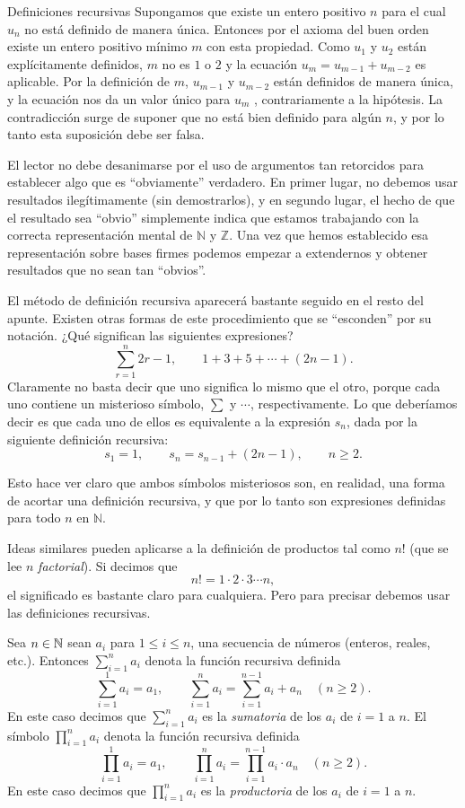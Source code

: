 \begin{section}{Definiciones recursivas}
Supongamos que existe un entero positivo $n$ para el cual $u_n$ no está definido de manera única. Entonces por el axioma del buen orden existe un entero positivo mínimo $m$ con esta propiedad. Como $u_1$ y $u_2$ están explícitamente definidos, $m$ no es $1$ o $2$ y la ecuación $u_m =u_{m-1} +u_{m-2}$ es aplicable. Por la definición de $m$, $u_{m-1}$ y $u_{m-2}$ están definidos de manera única, y la ecuación nos da un valor único para $u_m$ , contrariamente a la hipótesis. La contradicción surge de suponer que no está bien definido para algún $n$, y por lo tanto esta suposición debe ser falsa.

El lector no debe desanimarse por el uso de argumentos tan retorcidos para establecer algo que es ``obviamente'' verdadero. En primer lugar, no debemos usar resultados ilegítimamente (sin demostrarlos), y en segundo lugar, el hecho de que el resultado sea ``obvio'' simplemente indica que estamos trabajando con la correcta representación mental de $\mathbb N$ y $\mathbb Z$. Una vez que hemos establecido esa representación sobre bases firmes podemos empezar a extendernos y obtener resultados que no sean tan ``obvios''.

El método de definición recursiva aparecerá bastante seguido en el resto del apunte. Existen otras formas de este procedimiento que se ``esconden'' por su notación. ¿Qué significan las siguientes expresiones?
$$
\sum_{r=1}^{n} 2r-1,\qquad 1+3+5+\cdots +(2n-1).
$$
Claramente no basta decir que uno significa lo mismo que el otro, porque cada uno contiene un misterioso símbolo, $\sum$ y $\cdots$, respectivamente. Lo que deberíamos decir es que cada uno de ellos es equivalente a la expresión $s_n$, dada por la siguiente definición recursiva:
$$
s_1= 1, \qquad s_n = s_{n-1} +(2n-1), \qquad n\ge 2.
$$

Esto hace ver claro que ambos símbolos misteriosos son, en realidad, una forma de acortar una definición recursiva, y que por lo tanto son expresiones definidas para todo $n$ en $\mathbb N$.

Ideas similares pueden aplicarse a la definición de productos tal como $n!$ (que se lee $n$ \textit{factorial}). Si decimos que
$$
n!=1 \cdot 2 \cdot 3 \cdots n,
$$
el significado es bastante claro para cualquiera. Pero para precisar debemos usar las definiciones recursivas.

\begin{definicion} Sea $n \in {\mathbb N}$ sean $a_i$  para $1 \le i \le n$, una secuencia de números (enteros, reales, etc.). Entonces $\sum_{i=1}^{n} a_i$  denota la función recursiva definida  
    $$
    \sum_{i=1}^{1} a_i= a_1, \qquad \sum_{i=1}^{n} a_i = \sum_{i=1}^{n-1} a_i+ a_{n} \quad (n\ge 2).
    $$
    En  este caso  decimos que  $\sum_{i=1}^{n} a_i$ es la \textit{sumatoria} de los $a_i$ de $i=1$  a $n$. El símbolo $\prod_{i=1}^{n} a_i$ denota la función recursiva definida  
    $$
    \prod_{i=1}^{1} a_i= a_1, \qquad \prod_{i=1}^{n} a_i = \prod_{i=1}^{n-1} a_i \cdot  a_{n} \quad (n\ge 2).
    $$
    En  este caso  decimos que  $\prod_{i=1}^{n} a_i$ es la \textit{productoria} de los $a_i$ de $i=1$  a $n$. 
\end{definicion}




\end{section}
